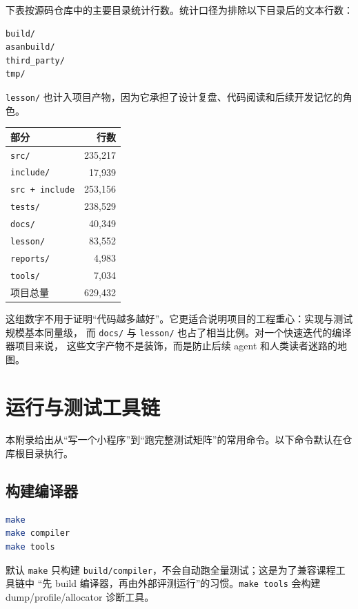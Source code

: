 \documentclass[UTF8,a4paper,11pt]{ctexart}
\begin{document}
下表按源码仓库中的主要目录统计行数。统计口径为排除以下目录后的文本行数：

\begin{lstlisting}[language={}]
build/
asanbuild/
third_party/
tmp/
\end{lstlisting}

\texttt{lesson/} 也计入项目产物，因为它承担了设计复盘、代码阅读和后续开发记忆的角色。

\begin{center}
\begin{tabular}{lr}
\toprule
部分 & 行数 \\
\midrule
\texttt{src/} & 235,217 \\
\texttt{include/} & 17,939 \\
\texttt{src + include} & 253,156 \\
\texttt{tests/} & 238,529 \\
\texttt{docs/} & 40,349 \\
\texttt{lesson/} & 83,552 \\
\texttt{reports/} & 4,983 \\
\texttt{tools/} & 7,034 \\
\midrule
项目总量 & 629,432 \\
\bottomrule
\end{tabular}
\end{center}

这组数字不用于证明“代码越多越好”。它更适合说明项目的工程重心：实现与测试规模基本同量级，
而 \texttt{docs/} 与 \texttt{lesson/} 也占了相当比例。对一个快速迭代的编译器项目来说，
这些文字产物不是装饰，而是防止后续 agent 和人类读者迷路的地图。

\section{运行与测试工具链}

本附录给出从“写一个小程序”到“跑完整测试矩阵”的常用命令。以下命令默认在仓库根目录执行。

\subsection{构建编译器}

\begin{lstlisting}[language=bash]
make
make compiler
make tools
\end{lstlisting}

默认 \texttt{make} 只构建 \texttt{build/compiler}，不会自动跑全量测试；这是为了兼容课程工具链中
“先 build 编译器，再由外部评测运行”的习惯。\texttt{make tools} 会构建 dump/profile/allocator
诊断工具。
\end{document}
